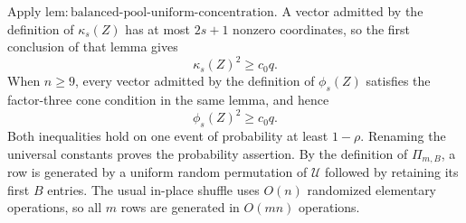 Apply \(\mathrm{lem{:}balanced\text{-}pool\text{-}uniform\text{-}concentration}\).  A vector admitted by the definition of \(\kappa_s(Z)\) has at most \(2s+1\) nonzero coordinates, so the first conclusion of that lemma gives
\[
 \kappa_s(Z)^2\ge c_0q.
\]
When \(n\ge9\), every vector admitted by the definition of \(\phi_s(Z)\) satisfies the factor-three cone condition in the same lemma, and hence
\[
 \phi_s(Z)^2\ge c_0q.
\]
Both inequalities hold on one event of probability at least \(1-\rho\).  Renaming the universal constants proves the probability assertion.  By the definition of \(\Pi_{m,B}\), a row is generated by a uniform random permutation of \(\mathcal U\) followed by retaining its first \(B\) entries.  The usual in-place shuffle uses \(O(n)\) randomized elementary operations, so all \(m\) rows are generated in \(O(mn)\) operations.